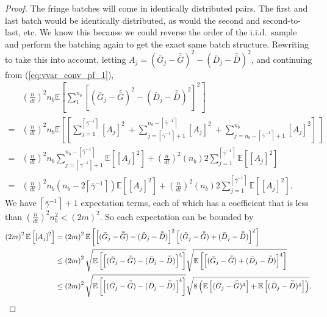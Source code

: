 \documentclass[12pt]{article}
\newcommand{\e}[1]{\mathbb{E} \left[ #1 \right]
}
\newcommand{\gammab}{\bar{\gamma}}
\newcommand{\gb}{\bar{G}}
\newcommand{\gbb}{\bar{\gb}}
\newcommand{\db}{\bar{D}}
\newcommand{\dbb}{\bar{\db}}
\begin{document}
\begin{proof}
	The fringe batches will come in identically distributed pairs.  
        The first and last batch would be identically distributed, as would the second and second-to-last, etc.  
        We know this because we could reverse the order of the i.i.d.\ sample and perform the batching again to get the exact same batch structure.  
        Rewriting to take this into account, letting $A_j = (\gb_j - \gbb)^2 - (\db_j - \dbb)^2$, and continuing from (\ref{eq:vvar_conv_pf_1}),
	\begin{align*}
		& \left( \frac{n}{dt} \right)^2 n_b \e{ \sum_{1}^{n_b} \left[ (\gb_j - \gbb)^2 - (\db_j - \dbb)^2 \right]^2 } \\
		 =  & \left( \frac{n}{dt} \right)^2 n_b \e{\left[ \sum_{j=1}^{\left\lceil \gammab^{-1} \right\rceil} \left[ A_j \right]^2 \
		 + \sum_{j=\left\lceil \gammab^{-1} \right\rceil+1}^{n_b-\left\lceil \gammab^{-1} \right\rceil} \left[ A_j \right]^2 \
		 + \sum_{j=n_b-\left\lceil \gammab^{-1} \right\rceil+1}^{n_b} \left[ A_j \right]^2 \right]\
		} \\
		 = & \left( \frac{n}{dt} \right)^2 n_b \sum_{j=\left\lceil \gammab^{-1} \right\rceil+1}^{n_b-\left\lceil \gammab^{-1} \right\rceil} \e{ \left[ A_j \right]^2 } + \left( \frac{n}{dt} \right)^2 (n_b) 2\sum_{j=1}^{\left\lceil \gammab^{-1} \right\rceil} \e{ \left[ A_j \right]^2 } \\
		 = & \left( \frac{n}{dt} \right)^2 n_b \left(n_b - 2\left\lceil \gammab^{-1} \right\rceil \right) \e{ \left[ A_j \right]^2 }
		+ \left( \frac{n}{dt} \right)^2 (n_b) 2\sum_{j=1}^{\left\lceil \gammab^{-1} \right\rceil} \e{ \left[ A_j \right]^2 }.
	\end{align*}	
	We have $\left\lceil \gammab^{-1} \right\rceil + 1$ expectation terms, each of which has a coefficient that is less than $\left(\frac{n}{dt}\right)^2n_b^2 < (2m)^2$.  
        So each expectation can be bounded by
	\begin{align}
		\left( 2m \right)^2 \e{ \left[ A_j \right]^2 } & = \left( 2m \right)^2 \e{ \left[(\gb_j - \gbb) - (\db_j - \dbb)\right]^2 \left[(\gb_j - \gbb) + (\db_j - \dbb)\right]^2 } \notag \\
		& \leq \left( 2m \right)^2 \sqrt{\e{\left[(\gb_j - \gbb) - (\db_j - \dbb)\right]^4}} \sqrt{\e{\left[(\gb_j - \gbb) + (\db_j - \dbb)\right]^4 }} \label{eq:var_reduct_cauchy2} \\
		& \leq \left( 2m \right)^2 \sqrt{\e{\left[(\gb_j - \gbb) - (\db_j - \dbb)\right]^4}} \sqrt{8 \left(\e{(\gb_j - \gbb)^4} + \e{(\db_j - \dbb)^4} \right)}, \label{eq:var_reduct_holder2}
	\end{align}

\end{proof}
\end{document}
